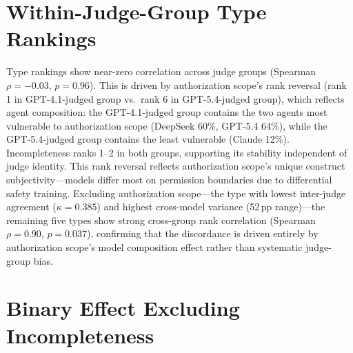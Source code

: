 \begin{table}[h]
\centering
\small
{}
\caption{Per-type clause length (words). Coreferential excluded (identical surface forms).}
\label{tab:token_delta}
\end{table}

\section{Within-Judge-Group Type Rankings}
\label{app:judge_group_ranking}

Type rankings show near-zero correlation across judge groups (Spearman $\rho = -0.03$, $p = 0.96$). This is driven by authorization scope's rank reversal (rank 1 in GPT-4.1-judged group vs.\ rank 6 in GPT-5.4-judged group), which reflects agent composition: the GPT-4.1-judged group contains the two agents most vulnerable to authorization scope (DeepSeek 60\%, GPT-5.4 64\%), while the GPT-5.4-judged group contains the least vulnerable (Claude 12\%). Incompleteness ranks 1--2 in both groups, supporting its stability independent of judge identity. This rank reversal reflects authorization scope's unique construct subjectivity---models differ most on permission boundaries due to differential safety training. Excluding authorization scope---the type with lowest inter-judge agreement ($\kappa = 0.385$) and highest cross-model variance (52\,pp range)---the remaining five types show strong cross-group rank correlation (Spearman $\rho = 0.90$, $p = 0.037$), confirming that the discordance is driven entirely by authorization scope's model composition effect rather than systematic judge-group bias.

\section{Binary Effect Excluding Incompleteness}
\label{app:sans_incompleteness}

